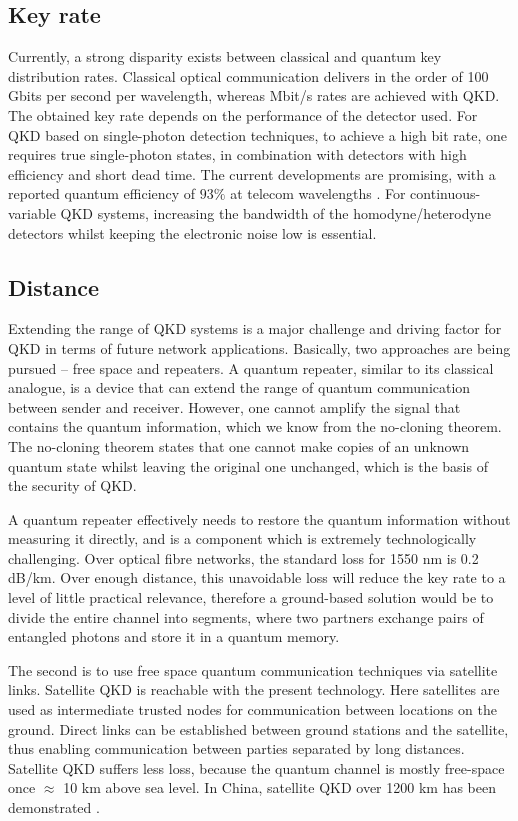 \subsection{Key rate}
Currently, a strong disparity exists between classical and quantum key distribution rates. Classical optical communication delivers in the order of 100 Gbits per second per wavelength, whereas Mbit/s rates are achieved with QKD.
% 
 The obtained key rate depends on the performance of the detector used. For QKD based on single-photon detection techniques, to achieve a high bit rate, one requires true single-photon states, in combination with detectors with high efficiency and short dead time. The current developments are promising, with a reported quantum efficiency of $93\%$ at telecom wavelengths \cite{marsili2013detecting}.
% 
 For continuous-variable QKD systems, increasing the bandwidth of the homodyne/heterodyne detectors whilst keeping the electronic noise low is essential.

\subsection{Distance}
Extending the range of QKD systems is a major challenge and driving factor for QKD in terms of future network applications. Basically, two approaches are being pursued -- free space and repeaters.  A quantum repeater, similar
to its classical analogue, is a device that can extend the range of quantum communication between sender and receiver. However, one cannot amplify the signal that contains the quantum information, which we know from the no-cloning theorem. The no-cloning theorem states that one cannot make copies of an unknown quantum state whilst leaving the original one unchanged, which is the basis of the security of QKD.

A quantum repeater effectively needs to restore the quantum information without measuring it directly, and is a component which is extremely technologically challenging. 
Over optical fibre networks, the standard loss for 1550 nm is 0.2 dB/km. Over enough distance, this unavoidable loss will reduce the key rate to a level of little practical relevance, therefore a ground-based solution would be to divide the entire channel into segments, where two partners exchange pairs of entangled photons and store it in a quantum memory\cite{PhysRevLett.81.5932,PhysRevA.59.169}.

The second is to use free space quantum communication techniques via satellite links. Satellite QKD is reachable with the present technology. Here satellites are used as intermediate trusted nodes for
communication between locations on the ground.
 Direct links can be
established between ground stations and the satellite, thus
enabling communication between parties separated by long distances. Satellite QKD suffers less loss, because the quantum channel is mostly free-space once $\approx$ 10 km above sea level.
% 
In China, satellite QKD over 1200 km has been demonstrated \cite{liao2017satellite}.


